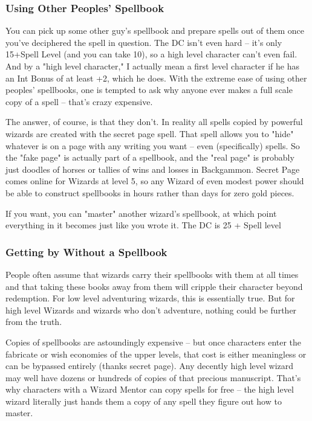 \subsubsection{Using Other Peoples' Spellbook}

You can pick up some other guy's spellbook and prepare spells out of them once you've deciphered the spell in question. The DC isn't even hard -- it's only 15+Spell Level (and you can take 10), so a high level character can't even fail. And by a "high level character," I actually mean a first level character if he has an Int Bonus of at least +2, which he does. With the extreme ease of using other peoples' spellbooks, one is tempted to ask why anyone ever makes a full scale copy of a spell -- that's crazy expensive.

The answer, of course, is that they don't. In reality all spells copied by powerful wizards are created with the secret page spell. That spell allows you to "hide" whatever is on a page with any writing you want -- even (specifically) spells. So the "fake page" is actually part of a spellbook, and the "real page" is probably just doodles of horses or tallies of wins and losses in Backgammon. Secret Page comes online for Wizards at level 5, so any Wizard of even modest power should be able to construct spellbooks in hours rather than days for zero gold pieces.

If you want, you can "master" another wizard's spellbook, at which point everything in it becomes just like you wrote it. The DC is 25 + Spell level

\subsubsection{Getting by Without a Spellbook}

People often assume that wizards carry their spellbooks with them at all times and that taking these books away from them will cripple their character beyond redemption. For low level adventuring wizards, this is essentially true. But for high level Wizards and wizards who don't adventure, nothing could be further from the truth.

Copies of spellbooks are astoundingly expensive -- but once characters enter the fabricate or wish economies of the upper levels, that cost is either meaningless or can be bypassed entirely (thanks secret page). Any decently high level wizard may well have dozens or hundreds of copies of that precious manuscript. That's why characters with a Wizard Mentor can copy spells for free -- the high level wizard literally just hands them a copy of any spell they figure out how to master.

